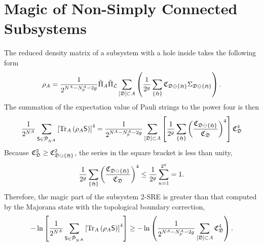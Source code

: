 \section{Magic of Non-Simply Connected Subsystems}
The reduced density matrix of a subsystem with a hole inside takes the following form
\[
    \rho_{A}
    =
    \frac{1}{2^{N^A - N^A_p - 2g}}
    \hat{\Pi}_A
     \hat{\Pi}_{\mathcal{L}}
    \sum_{[\mathfrak{D}]\subset A}
    \left( 
    \frac{1}{2^g}
    \sum_{\left\{ \mathfrak{H} \right\}}
        \mathfrak{C}_{\mathfrak{D}\ominus\left\{ \mathfrak{H} \right\}} \Sigma_{\mathfrak{D}\ominus\left\{ \mathfrak{H} \right\}} 
     \right).
\] 
The summation of the expectation value of Pauli strings to the power four is then
\[
    \frac{1}{2^{N^A}}
    \sum_{\mathsf{S}\in\tilde{\mathcal{P}}_{N^A}}
    \left[ \mathrm{Tr}_A\left( \rho_A\mathsf{S} \right) \right]^{4}
    =
    \frac{1}{2^{N^A - N_p^A - 2g}}
    \sum_{[\mathfrak{D}] \subset A}
    \left[ 
        \frac{1}{2^g}
        \sum_{\left\{ \mathfrak{H} \right\}} \left( \frac{\mathfrak{C}_{\mathfrak{\mathfrak{D}\ominus\left\{ \mathfrak{H} \right\}}}}{\mathfrak{C}_\mathfrak{D}} \right)^4
     \right]
    \mathfrak{C}_\mathfrak{D}^4
\]
Because $\mathfrak{C}_\mathfrak{D}^2 \geq \mathfrak{C}_{\mathfrak{D}\ominus\left\{ \mathfrak{H} \right\}}^2$, the series in the square bracket is less than unity,
\[
\frac{1}{2^g}
\sum_{\left\{ \mathfrak{H} \right\}} \left( \frac{\mathfrak{C}_{\mathfrak{\mathfrak{D}\ominus\left\{ \mathfrak{H} \right\}}}}{\mathfrak{C}_\mathfrak{D}} \right)^4
\leq
\frac{1}{2^g}
\sum_{n=1}^{2^g}
=
1.
\]
Therefore, the magic part of the subsystem 2-SRE is greater than that computed by the Majorana state with the topological boundary correction,
\[
    -\ln\left[ 
        \frac{1}{2^{N^A}}
        \sum_{\mathsf{S}\in\tilde{\mathcal{P}}_{N^A}}
        \left[ \mathrm{Tr}_A\left( \rho_A\mathsf{S} \right) \right]^{4}
     \right]
    \geq
    -\ln\left( 
        \frac{1}{2^{N^A - N_p^A - 2g}}
        \sum_{[\mathfrak{D}] \subset A}
        \mathfrak{C}_\mathfrak{D}^4
     \right).
\]

